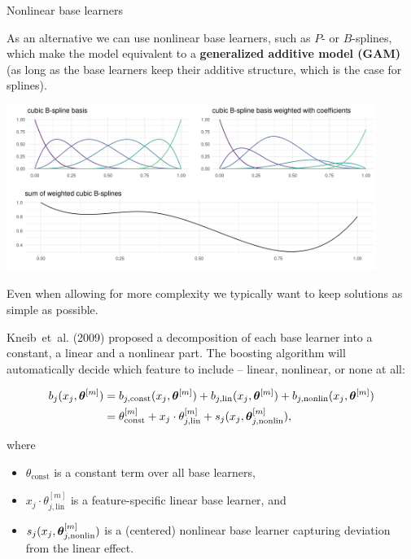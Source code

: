 \begin{vbframe}{Nonlinear base learners}

As an alternative we can use nonlinear base learners, such as $P$- or
$B$-splines, which make the model equivalent to a
\textbf{generalized additive model (GAM)} (as long as the base learners keep
their additive structure, which is the case for splines).
\vspace{0.5cm}

\vfill

\begin{center}
\includegraphics[width=0.9\textwidth]{figure/bspline-basis.png}
\end{center}

%

\framebreak


Even when allowing for more complexity we typically want to keep solutions as
simple as possible.

\lz

Kneib~et~al. (2009) proposed a decomposition of each base learner into a
constant, a linear and a nonlinear part.
The boosting algorithm will automatically decide which feature to include --
linear, nonlinear, or none at all:

\vspace{-0.5cm}

\begin{align*}
b_j(x_j, \bm{\theta}^{[m]}) & = b_{j, \text{const}}(x_j, \bm{\theta}^{[m]}) + b_{j, \text{lin}}
(x_j, \bm{\theta}^{[m]}) + b_{j, \text{nonlin}}(x_j, \bm{\theta}^{[m]})\\
 & = \theta^{[m]}_\text{const} + x_j \cdot \theta^{[m]}_{j, \text{lin}} +
 s_j(x_j, \bm{\theta}^{[m]}_{j,\text{nonlin}}),
\end{align*}

\small
where
\begin{itemize}
  \small
  \item $\theta_\text{const}$ is a constant term over all base learners,
  \item $x_j \cdot \theta^{[m]}_{j, \text{lin}}$ is a feature-specific linear
  base learner, and
  \item $s_j(x_j, \bm{\theta}^{[m]}_{j,\text{nonlin}})$ is a (centered) nonlinear base
  learner capturing deviation from the linear effect.
\end{itemize}

\end{vbframe}

